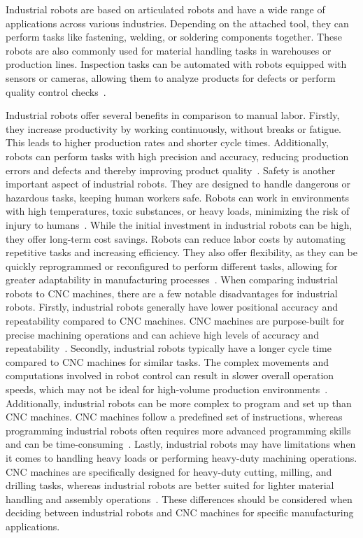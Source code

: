 Industrial robots are based on articulated robots and have a wide range of applications across various industries. Depending on the attached tool, they can perform tasks like fastening, welding, or soldering components together. These robots are also commonly used for material handling tasks in warehouses or production lines. Inspection tasks can be automated with robots equipped with sensors or cameras, allowing them to analyze products for defects or perform quality control checks~\cite{Hagele.2016}.


Industrial robots offer several benefits in comparison to manual labor. Firstly, they increase productivity by working continuously, without breaks or fatigue. This leads to higher production rates and shorter cycle times. Additionally, robots can perform tasks with high precision and accuracy, reducing production errors and defects and thereby improving product quality~\cite{Kubela.2016}. Safety is another important aspect of industrial robots. They are designed to handle dangerous or hazardous tasks, keeping human workers safe. Robots can work in environments with high temperatures, toxic substances, or heavy loads, minimizing the risk of injury to humans~\cite{Heyer.2010}.
While the initial investment in industrial robots can be high, they offer long-term cost savings. Robots can reduce labor costs by automating repetitive tasks and increasing efficiency. They also offer flexibility, as they can be quickly reprogrammed or reconfigured to perform different tasks, allowing for greater adaptability in manufacturing processes~\cite{Jung.2020b}.
\newpage
When comparing industrial robots to \acrshort{CNC} machines, there are a few notable disadvantages for industrial robots. Firstly, industrial robots generally have lower positional accuracy and repeatability compared to \acrshort{CNC} machines. \acrshort{CNC} machines are purpose-built for precise machining operations and can achieve high levels of accuracy and repeatability~\cite{Wang.2023}.
Secondly, industrial robots typically have a longer cycle time compared to \acrshort{CNC} machines for similar tasks. The complex movements and computations involved in robot control can result in slower overall operation speeds, which may not be ideal for high-volume production environments~\cite{Joshi.2021}.
Additionally, industrial robots can be more complex to program and set up than \acrshort{CNC} machines. \acrshort{CNC} machines follow a predefined set of instructions, whereas programming industrial robots often requires more advanced programming skills and can be time-consuming~\cite{Ye.2022}. Lastly, industrial robots may have limitations when it comes to handling heavy loads or performing heavy-duty machining operations. \acrshort{CNC} machines are specifically designed for heavy-duty cutting, milling, and drilling tasks, whereas industrial robots are better suited for lighter material handling and assembly operations~\cite{Wu.2022}. These differences should be considered when deciding between industrial robots and \acrshort{CNC} machines for specific manufacturing applications.

